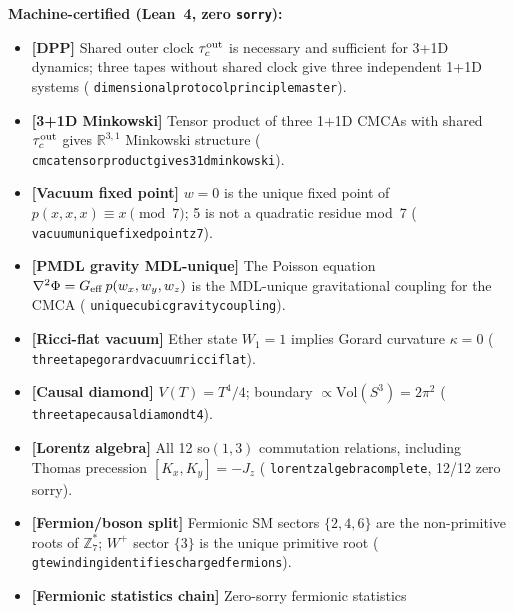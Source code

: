 \documentclass[11pt]{article}
\theoremstyle{remark}
\newcommand{\ZS}{\mathbb{Z}_7}
\newcommand{\lean}[1]{%
  \penalty-100
  \begingroup\def\_{\textunderscore\allowbreak}\texttt{#1}\endgroup}
\newcommand{\CMCA}{\text{CMCA}}
\newcommand{\taucout}{\tau_c^{\rm out}}
\begin{document}
\tableofcontents
\newpage

\begin{tcolorbox}[colback=orange!8,colframe=orange!60!black,
  title={\textbf{What this paper claims}},
  fonttitle=\bfseries,left=6pt,right=6pt,top=5pt,bottom=5pt,breakable]
\small
\textbf{Machine-certified (Lean~4, zero \texttt{sorry}):}
\begin{itemize}[noitemsep,topsep=2pt]
  \item \textbf{[DPP]} Shared outer clock $\taucout$ is necessary and sufficient
        for 3+1D dynamics; three tapes without shared clock give three independent
        1+1D systems
        (\lean{dimensional\_protocol\_principle\_master}).
  \item \textbf{[3+1D Minkowski]} Tensor product of three 1+1D $\CMCA$s with
        shared $\taucout$ gives $\mathbb{R}^{3,1}$ Minkowski structure
        (\lean{cmca\_tensor\_product\_gives\_31d\_minkowski}).
  \item \textbf{[Vacuum fixed point]} $w{=}0$ is the unique fixed point of
        $p(x,x,x) \equiv x \pmod{7}$; 5 is not a quadratic residue mod~7
        (\lean{vacuum\_unique\_fixed\_point\_z7}).
  \item \textbf{[PMDL gravity MDL-unique]} The Poisson equation
        $\nabla^2\Phi = G_{\rm eff}\,p(w_x,w_y,w_z)$ is the MDL-unique
        gravitational coupling for the $\CMCA$
        (\lean{unique\_cubic\_gravity\_coupling}).
  \item \textbf{[Ricci-flat vacuum]} Ether state $W_1 = 1$ implies Gorard
        curvature $\kappa = 0$
        (\lean{three\_tape\_gorard\_vacuum\_ricci\_flat}).
  \item \textbf{[Causal diamond]} $V(T) = T^4/4$; boundary
        $\propto \mathrm{Vol}(S^3) = 2\pi^2$
        (\lean{three\_tape\_causal\_diamond\_t4}).
  \item \textbf{[Lorentz algebra]} All 12 so$(1,3)$ commutation relations,
        including Thomas precession $[K_x,K_y]=-J_z$
        (\lean{lorentz\_algebra\_complete}, 12/12 zero sorry).
  \item \textbf{[Fermion/boson split]} Fermionic SM sectors $\{2,4,6\}$ are the
        non-primitive roots of $\ZS^*$; $W^+$ sector $\{3\}$ is the unique
        primitive root
        (\lean{gte\_winding\_identifies\_charged\_fermions}).
  \item \textbf{[Fermionic statistics chain]} Zero-sorry fermionic statistics

\end{itemize}
\end{tcolorbox}
\end{document}
